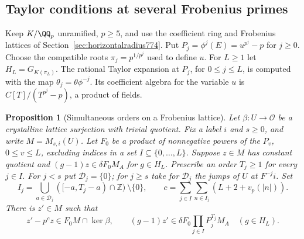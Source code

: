 \documentclass[a4paper,11pt]{article}
\newtheorem{proposition}{Proposition}[section]
\theoremstyle{definition}
\theoremstyle{remark}
\newcommand{\ZZ}{\mathbb Z}\newcommand{\ord}{\operatorname{ord}}
\numberwithin{equation}{section}
\begin{document}
\subsection{Taylor conditions at several Frobenius primes}
\label{sec:severalprimes779}
Keep \(K/\QQ_p\) unramified, \(p\ge5\), and use the
coefficient ring and Frobenius lattices of
Section~\ref{sec:horizontalradius774}. Put \(P_j=\phi^j(E)
=u^{p^j}-p\) for \(j\ge0\). Choose the compatible roots
\(\pi_j=p^{1/p^j}\) used to define \(u\).
For \(L\ge1\) let \(H_L=G_{K(\pi_L)}\). The rational
Taylor expansion at \(P_j\), for \(0\le j\le L\), is
computed with the map \(\theta_j=\theta\phi^{-j}\).
Its coefficient algebra for the variable \(u\) is
\(C[T]/(T^{p^j}-p)\), a product of fields.

\begin{proposition}[Simultaneous orders on a Frobenius lattice]
\leavevmode\label{prop:simultaneousorders779}
Let \(\beta:U\to\mathcal O\) be a crystalline lattice
surjection with trivial quotient. Fix a label \(i\) and
\(s\ge0\), and write \(M=M_{s,i}(U)\).
Let \(F_0\) be a product of nonnegative powers of the
\(P_v\), \(0\le v\le L\), excluding indices in a set
\(I\subseteq\{0,\ldots,L\}\). Suppose \(z\in M\) has
constant quotient and
\((g-1)z\in\delta F_0 M_A\) for \(g\in H_L\).
Prescribe an order \(T_j\ge1\) for every \(j\in I\).
For \(j<s\) put \(\mathcal D_j=\{0\}\); for \(j\ge s\)
take for \(\mathcal D_j\) the jumps of \(U\) at \(F^{-j}i\).
Set
\[
 I_j=\bigcup_{a\in\mathcal D_j}([-a,T_j-a)\cap\ZZ)
                           \ \setminus\{0\},\qquad
 c=\sum_{j\in I}\sum_{n\in I_j}(L+2+v_p(|n|)).
\]
There is \(z'\in M\) such that
\[
 z'-p^c z\in F_0 M\cap\ker\beta,\qquad
 (g-1)z'\in\delta F_0\prod_{j\in I}P_j^{T_j}M_A
                                                \quad(g\in H_L).
\]
\end{proposition}
\end{document}
